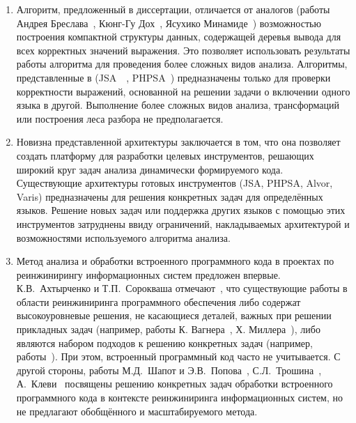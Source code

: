 \begin{enumerate}

\item Алгоритм, предложенный в диссертации, отличается от аналогов (работы Андрея Бреслава~\cite{Alvor1, Alvor2}, Кюнг-Гу Дох~\cite{LrAbstract1, LrAbstract2}, Ясухико Минамиде~\cite{PHPSA}) возможностью построения компактной структуры данных, содержащей деревья вывода для всех корректных значений выражения. Это позволяет использовать результаты работы алгоритма для проведения более сложных видов анализа. Алгоритмы, представленные в (JSA~\cite{JSA}~\cite{Alvor1, Alvor2}, PHPSA~\cite{PHPSA}) предназначены только для проверки корректности выражений, основанной на решении задачи о включении одного языка в другой. Выполнение более сложных видов анализа, трансформаций или построения леса разбора не предполагается. 

\item Новизна представленной архитектуры заключается в том, что она позволяет создать платформу для разработки целевых инструментов, решающих широкий круг задач анализа динамически формируемого кода. Существующие архитектуры готовых инструментов (JSA, PHPSA, Alvor, Varis) предназначены для решения конкретных задач для определённых языков. Решение новых задач или поддержка других языков с помощью этих инструментов затруднены ввиду ограничений, накладываемых архитектурой и возможностями используемого алгоритма анализа. 

\item Метод анализа и обработки встроенного программного кода в проектах по реинжинирингу информационных систем предложен впервые. К.В.~Ахтырченко и Т.П.~Сорокваша отмечают~\cite{SoftwareReengMethods}, что существующие работы в области реинжиниринга программного обеспечения либо содержат высокоуровневые решения, не касающиеся деталей, важных при решении прикладных задач (например, работы К. Вагнера~\cite{SoftwareReeng3}, Х. Миллера~\cite{SoftwareReeng2}), либо являются набором подходов к решению конкретных задач (например, работы~\cite{SoftwareReeng1, reengANT, boulychev}). При этом, встроенный программный код часто не учитывается. С другой стороны, работы М.Д.~Шапот и Э.В.~Попова~\cite{DynamicDSQLTranslation}, С.Л.~Трошина~\cite{reengANT}, А.~Клеви~\cite{DSQLReverseEngineering}  посвящены решению конкретных задач обработки встроенного программного кода в контексте реинжиниринга информационных систем, но не предлагают обобщённого и масштабируемого метода.

\end{enumerate}


